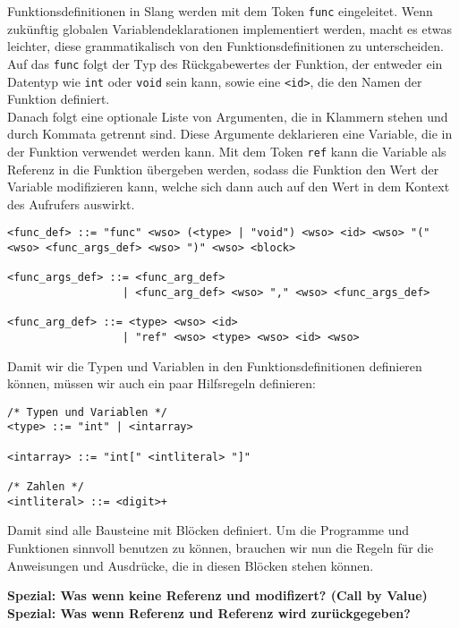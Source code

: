 Funktionsdefinitionen in Slang werden mit dem Token \texttt{func} eingeleitet.
Wenn zukünftig globalen Variablendeklarationen implementiert werden, macht es etwas leichter, diese grammatikalisch von den Funktionsdefinitionen zu unterscheiden.\\
Auf das \texttt{func} folgt der Typ des Rückgabewertes der Funktion, der entweder ein Datentyp wie \texttt{int} oder \texttt{void} sein kann, sowie eine \texttt{<id>}, die den Namen der Funktion definiert.\\
Danach folgt eine optionale Liste von Argumenten, die in Klammern stehen und durch Kommata getrennt sind.
Diese Argumente deklarieren eine Variable, die in der Funktion verwendet werden kann.
Mit dem Token \texttt{ref} kann die Variable als Referenz in die Funktion übergeben werden, sodass die Funktion den Wert der Variable modifizieren kann, welche sich dann auch auf den Wert in dem Kontext des Aufrufers auswirkt.\\

\begin{lstlisting}
<func_def> ::= "func" <wso> (<type> | "void") <wso> <id> <wso> "(" <wso> <func_args_def> <wso> ")" <wso> <block>

<func_args_def> ::= <func_arg_def>
                  | <func_arg_def> <wso> "," <wso> <func_args_def>

<func_arg_def> ::= <type> <wso> <id>
                  | "ref" <wso> <type> <wso> <id> <wso>
\end{lstlisting}

Damit wir die Typen und Variablen in den Funktionsdefinitionen definieren können, müssen wir auch ein paar Hilfsregeln definieren:\\

\begin{lstlisting}
/* Typen und Variablen */
<type> ::= "int" | <intarray>

<intarray> ::= "int[" <intliteral> "]"

/* Zahlen */
<intliteral> ::= <digit>+
\end{lstlisting}

Damit sind alle Bausteine mit Blöcken definiert.
Um die Programme und Funktionen sinnvoll benutzen zu können, brauchen wir nun die Regeln für die Anweisungen und Ausdrücke, die in diesen Blöcken stehen können.

\textbf{Spezial: Was wenn keine Referenz und modifizert? (Call by Value)}\\
\textbf{Spezial: Was wenn Referenz und Referenz wird zurückgegeben?}\\
\\

